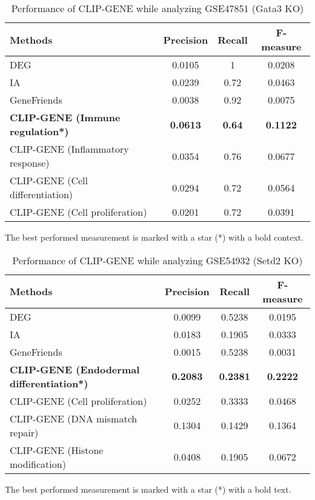 \documentclass[oneside,phd]{snuthesis}
\begin{document}
\begin{table}
\begin{tabular}{ l c c c  }
\hline
Methods & Precision  & Recall & F-measure\\
\hline
DEG & 0.0105 & 1 & 0.0208\\
IA & 0.0239 & 0.72  & 0.0463 \\
GeneFriends & 0.0038 & 0.92 & 0.0075\\
\textbf{CLIP-GENE (Immune regulation*)} & \textbf{0.0613}  & \textbf{0.64}   & \textbf{0.1122}\\
CLIP-GENE (Inflammatory response) & 0.0354  & 0.76   & 0.0677\\
CLIP-GENE (Cell differentiation) & 0.0294  & 0.72   & 0.0564\\ 
CLIP-GENE (Cell proliferation) & 0.0201  & 0.72   &0.0391\\ \hline
\end{tabular}
\caption{Performance of CLIP-GENE while analyzing GSE47851 (Gata3 KO)}
\scriptsize{The best performed measurement is marked with a star (*) with a bold context.}
\label{clip_table1}
\end{table}



\begin{table}
\begin{tabular}{ l cc c  }
\hline
Methods     & Precision  & Recall   & F-measure\\
\hline
DEG & 0.0099 & 0.5238 & 0.0195\\
IA & 0.0183 & 0.1905 & 0.0333 \\
GeneFriends & 0.0015 & 0.5238 & 0.0031\\
\textbf{CLIP-GENE (Endodermal differentiation*)} & \textbf{0.2083}  & \textbf{0.2381}   & \textbf{0.2222}\\ 
CLIP-GENE (Cell proliferation) & 0.0252  & 0.3333   & 0.0468\\ 
CLIP-GENE (DNA mismatch repair) & 0.1304  & 0.1429   & 0.1364\\
CLIP-GENE (Histone modification) & 0.0408  & 0.1905   & 0.0672\\ 
\hline
\end{tabular}
\caption{Performance of CLIP-GENE while analyzing GSE54932 (Setd2 KO)}
\scriptsize{The best performed measurement is marked with a star (*) with a bold text.}
\label{clip_table2}
\end{table}
\end{document}
